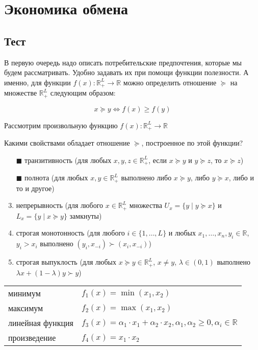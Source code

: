 \solution %















\section{Экономика обмена}
\subsection{Тест}

\task
В первую очередь надо описать потребительские предпочтения, которые мы будем рассматривать. Удобно задавать их при помощи функции полезности. А именно, для функции $f(x) \colon \mathbb{R}^{L}_+ \to \mathbb{R}$ можно определить отношение $\succeq$ на множестве $\mathbb{R}^{L}_+$ следующим образом:

\[
	x \succeq y \Leftrightarrow f(x) \geq f(y)
\]

Рассмотрим произвольную функцию $f(x) \colon \mathbb{R}^L_+ \rightarrow \mathbb{R}$

Какими свойствами обладает отношение $\succeq$, построенное по этой функции?

\begin{enumerate}[label=$\square$] %
	\item[$\blacksquare$] транзитивность (для любых $x,y,z\in \mathbb{R}^L_+$, если $x \succeq y$ и $y \succeq z$, то $x \succeq z$)
	\item[$\blacksquare$] полнота (для любых $x,y \in \mathbb{R}^L_+$ выполнено либо $x \succeq y$, либо $y \succeq x$, либо и то и другое)
	\item непрерывность (для любого $x \in \mathbb{R}^L_+$ множества $U_x=\{y \mid y \succeq x\}$ и $L_x=\{y \mid x \succeq y\}$ замкнуты)
	\item строгая монотонность (для любого $i \in \{1,\ldots,L\}$ и любых $x_1,\ldots,x_n,y_i \in \mathbb{R}$, $y_i > x_i$ выполнено $(y_i,x_{-i}) \succ (x_i,x_{-i})$)
	\item строгая выпуклость (для любых $x \succeq y \in \mathbb{R}^L_+$, $x \neq y$, $\lambda \in (0,1)$ выполнено $\lambda x+ (1-\lambda)y \succ y$)
\end{enumerate}

\task
\begin{tabular}{ll}
	
	минимум & $f_1(x)= \min(x_1,x_2)$ \\
	максимум & $f_2(x) = \max(x_1,x_2)$ \\
	линейная функция & $f_3(x) = \alpha_1\cdot x_1+\alpha_2 \cdot x_2, \alpha_1,\alpha_2 \geq 0, \alpha_i \in \mathbb{R}$ \\
	произведение & $f_4(x) = x_1 \cdot x_2$ \\
\end{tabular}

